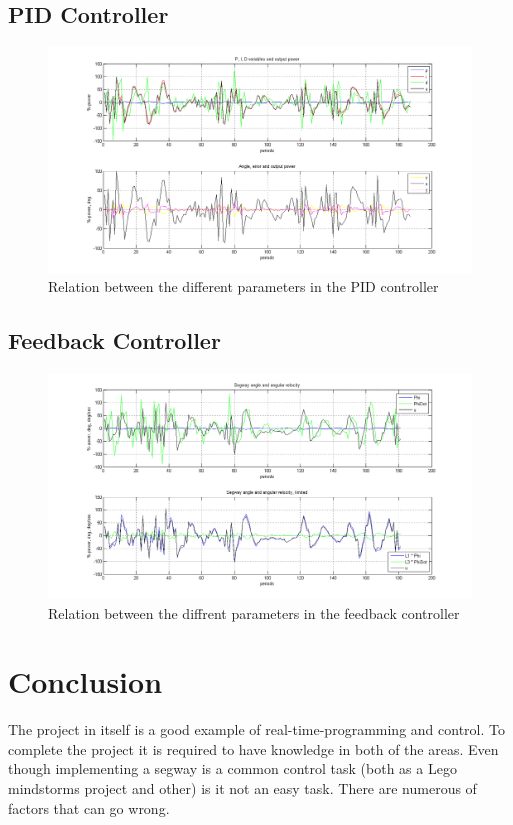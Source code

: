 \documentclass[a4paper]{article}
\begin{document}
\subsection{PID Controller}
\begin{figure}[H]
  \centering
\includegraphics[scale=0.45]{pic/pid.png}
\caption{Relation between the different parameters in the PID controller}
\end{figure}

\subsection{Feedback Controller}
\begin{figure}[H]
  \centering
\includegraphics[scale=0.45]{pic/feedbackPlot.png}
\caption{Relation between the diffrent parameters in the feedback controller}
\end{figure}

\section{Conclusion}
The project in itself is a good example of real-time-programming and control. To complete the project it is required to have knowledge in both of the areas. Even though implementing a segway is a common control task (both as a Lego mindstorms project and other) is it not an easy task. There are numerous of factors that can go wrong.\\
\end{document}
